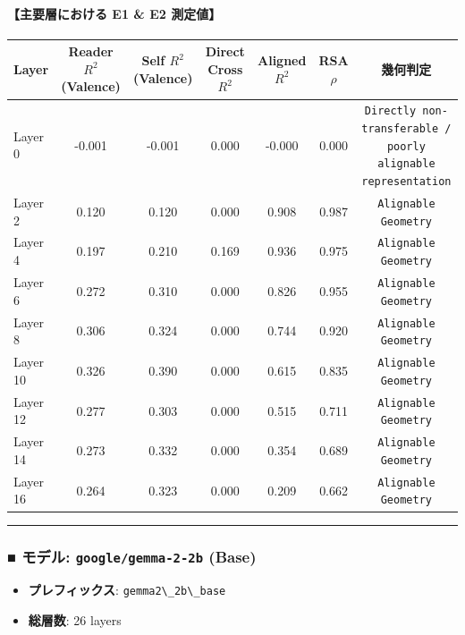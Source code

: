 \paragraph{【主要層における E1 \& E2 測定値】}
\begin{center}
\small
\begin{tabular}{lcccccc}
\toprule
\textbf{Layer} & \textbf{Reader $R^2$ (Valence)} & \textbf{Self $R^2$ (Valence)} & \textbf{Direct Cross $R^2$} & \textbf{Aligned $R^2$} & \textbf{RSA $\rho$} & \textbf{幾何判定} \\
\midrule
Layer  0 & -0.001 & -0.001 & 0.000 & -0.000 & 0.000 & \texttt{Directly non-transferable / poorly alignable representation} \\
Layer  2 & 0.120 & 0.120 & 0.000 & 0.908 & 0.987 & \texttt{Alignable Geometry} \\
Layer  4 & 0.197 & 0.210 & 0.169 & 0.936 & 0.975 & \texttt{Alignable Geometry} \\
Layer  6 & 0.272 & 0.310 & 0.000 & 0.826 & 0.955 & \texttt{Alignable Geometry} \\
Layer  8 & 0.306 & 0.324 & 0.000 & 0.744 & 0.920 & \texttt{Alignable Geometry} \\
Layer 10 & 0.326 & 0.390 & 0.000 & 0.615 & 0.835 & \texttt{Alignable Geometry} \\
Layer 12 & 0.277 & 0.303 & 0.000 & 0.515 & 0.711 & \texttt{Alignable Geometry} \\
Layer 14 & 0.273 & 0.332 & 0.000 & 0.354 & 0.689 & \texttt{Alignable Geometry} \\
Layer 16 & 0.264 & 0.323 & 0.000 & 0.209 & 0.662 & \texttt{Alignable Geometry} \\
\bottomrule
\end{tabular}
\end{center}



\vspace{0.5em}\hrule\vspace{0.5em}

\subsubsection{■ モデル: \texttt{google/gemma-2-2b} (Base)}
\begin{itemize}
\item \textbf{プレフィックス}: \texttt{gemma2\textbackslash{}\_2b\textbackslash{}\_base}
\item \textbf{総層数}: 26 layers
\end{itemize}

